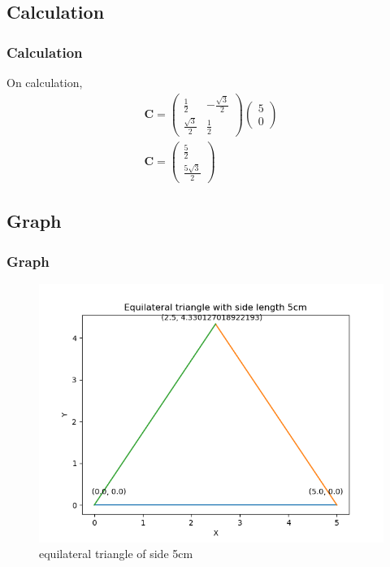 \documentclass{beamer}
\theoremstyle{remark}
\newcommand{\myvec}[1]{\ensuremath{\begin{pmatrix}#1\end{pmatrix}}}
\let\vec\mathbf
\numberwithin{equation}{section}
\begin{document}
\subsection{Calculation}
\begin{frame}
\frametitle{Calculation}

On calculation,
\begin{align}
    \vec{C} = \myvec{\frac{1}{2} & -\frac{\sqrt{3}}{2}\\ \frac{\sqrt{3}}{2} & \frac{1}{2}} \myvec{5\\0}\\
    \vec{C} = \myvec{\frac{5}{2} \\ \frac{5\sqrt{3}}{2}}
\end{align}
\end{frame}

\subsection{Graph}
\begin{frame}[fragile]
\frametitle{Graph}
\begin{figure}[h!]
   \centering
   \includegraphics[width=0.7\linewidth]{figs/fig.png}
   \caption{equilateral triangle of side 5cm}
\end{figure}
\end{frame}
\end{document}
